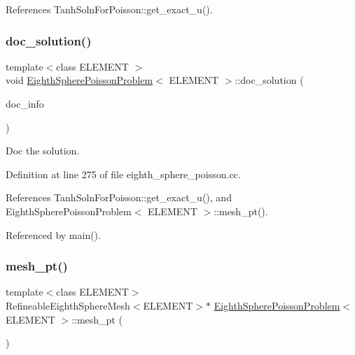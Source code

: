 References Tanh\+Soln\+For\+Poisson\+::get\+\_\+exact\+\_\+u().

\mbox{\label{classEighthSpherePoissonProblem_ac8e9911536d04bab829cfe92bb40e302}} 
\subsubsection{\texorpdfstring{doc\+\_\+solution()}{doc\_solution()}}
{\footnotesize\ttfamily template$<$class E\+L\+E\+M\+E\+NT $>$ \\
void \hyperlink{classEighthSpherePoissonProblem}{Eighth\+Sphere\+Poisson\+Problem}$<$ E\+L\+E\+M\+E\+NT $>$\+::doc\+\_\+solution (\begin{DoxyParamCaption}\item[{Doc\+Info \&}]{doc\+\_\+info }\end{DoxyParamCaption})}



Doc the solution. 



Definition at line 275 of file eighth\+\_\+sphere\+\_\+poisson.\+cc.



References Tanh\+Soln\+For\+Poisson\+::get\+\_\+exact\+\_\+u(), and Eighth\+Sphere\+Poisson\+Problem$<$ E\+L\+E\+M\+E\+N\+T $>$\+::mesh\+\_\+pt().



Referenced by main().

\mbox{\label{classEighthSpherePoissonProblem_aa33edbb75ba8fe8d4daac3c940a7ff6a}} 
\subsubsection{\texorpdfstring{mesh\+\_\+pt()}{mesh\_pt()}}
{\footnotesize\ttfamily template$<$class E\+L\+E\+M\+E\+NT$>$ \\
Refineable\+Eighth\+Sphere\+Mesh$<$E\+L\+E\+M\+E\+NT$>$$\ast$ \hyperlink{classEighthSpherePoissonProblem}{Eighth\+Sphere\+Poisson\+Problem}$<$ E\+L\+E\+M\+E\+NT $>$\+::mesh\+\_\+pt (\begin{DoxyParamCaption}{ }\end{DoxyParamCaption})\hspace{0.3cm}{\ttfamily [inline]}}



